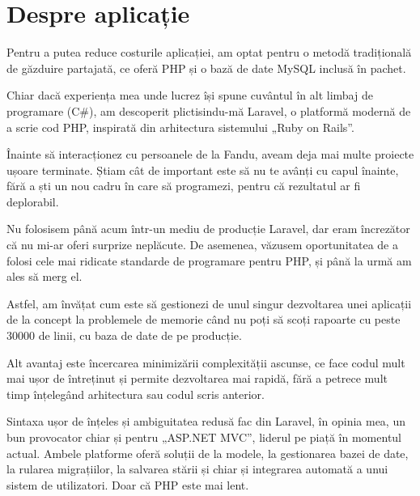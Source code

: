 \section{Despre aplicație}
	Pentru a putea reduce costurile aplicației, am optat pentru o metodă tradițională de găzduire partajată, ce oferă PHP și o bază de date MySQL inclusă în pachet.

	Chiar dacă experiența mea unde lucrez își spune cuvântul în alt limbaj de programare (C\#), am descoperit plictisindu-mă Laravel\cite{laravel}, o platformă modernă de a scrie cod PHP, inspirată din arhitectura sistemului  „Ruby on Rails”.

	Înainte să interacționez cu persoanele de la Fandu, aveam deja mai multe proiecte ușoare terminate.
	Știam cât de important este să nu te avânți cu capul înainte, fără a ști un nou cadru în care să programezi, pentru că rezultatul ar fi deplorabil.

	Nu folosisem până acum într-un mediu de producție Laravel, dar eram încrezător că nu mi-ar oferi surprize neplăcute.
	De asemenea, văzusem oportunitatea de a folosi cele mai ridicate standarde de programare pentru PHP, și până la urmă am ales să merg el.

	Astfel, am învățat cum este să gestionezi de unul singur dezvoltarea unei aplicații de la concept la problemele de memorie când nu poți să scoți rapoarte cu peste 30000 de linii, cu baza de date de pe producție.

	Alt avantaj este încercarea minimizării complexității ascunse\cite{laravel_complexity}, ce face codul mult mai ușor de întreținut și permite dezvoltarea mai rapidă, fără a petrece mult timp înțelegând arhitectura sau codul scris anterior. 

	Sintaxa ușor de înțeles și ambiguitatea redusă fac din Laravel, în opinia mea, un bun provocator chiar și pentru „ASP.NET MVC”\cite{hotframeworks}, liderul pe piață în momentul actual. Ambele platforme oferă soluții de la modele, la gestionarea bazei de date, la rularea migrațiilor, la salvarea stării și chiar și integrarea automată a unui sistem de utilizatori. Doar că PHP este mai lent. 
